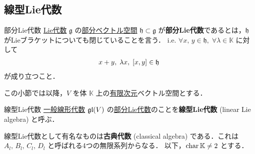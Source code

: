 \documentclass[rep_main]{subfiles}
\begin{document}
\subsection{線型Lie代数}

\begin{mydef}[label=def:subLieAlg]{部分Lie代数}
    \hyperref[ax:LieAlg]{Lie代数} $\mathfrak{g}$ の\underline{部分ベクトル空間} $\mathfrak{h} \subset \mathfrak{g}$ が\textbf{部分Lie代数}であるとは，$\mathfrak{h}$ がLieブラケットについても閉じていることを言う．
    i.e. $\forall x,\, y \in \mathfrak{h},\; \forall \lambda \in \mathbb{K}$ に対して
    \begin{align}
        x + y,\; \lambda x,\; \comm{x}{y} \in \mathfrak{h}
    \end{align}
    が成り立つこと．
\end{mydef}

この小節では以降，$V$ を体 $\mathbb{K}$ 上の\underline{有限次元}ベクトル空間とする．

\begin{mydef}[label=def:linearLieAlg]{線型Lie代数}
    \hyperref[def:gl-alg]{一般線形代数} $\mathfrak{gl} (V)$ の\hyperref[def:subLieAlg]{部分Lie代数}のことを\textbf{線型Lie代数} (linear Lie algebra) と呼ぶ．
\end{mydef}

線型Lie代数として有名なものは\textbf{古典代数} (classical algebra) である．これは $A_l,\, B_l,\, C_l,\, D_l$ と呼ばれる4つの無限系列からなる．
以下，$\operatorname{char} \mathbb{K} \neq 2$ とする．
\end{document}

